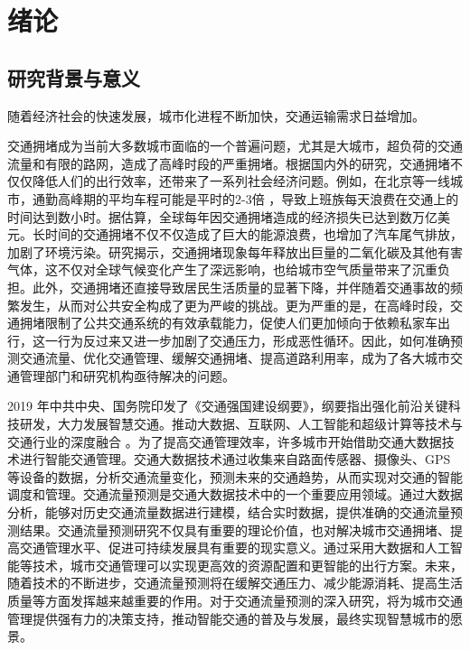 
\chapter{绪论}
\section{研究背景与意义}
随着经济社会的快速发展，城市化进程不断加快，交通运输需求日益增加。

交通拥堵成为当前大多数城市面临的一个普遍问题，尤其是大城市，超负荷的交通流量和有限的路网，造成了高峰时段的严重拥堵。根据国内外的研究，交通拥堵不仅仅降低人们的出行效率，还带来了一系列社会经济问题。例如，在北京等一线城市，通勤高峰期的平均车程可能是平时的2-3倍 \parencite{2021_贾若_交通拥堵判别方法研究综述}，导致上班族每天浪费在交通上的时间达到数小时。据估算，全球每年因交通拥堵造成的经济损失已达到数万亿美元。长时间的交通拥堵不仅不仅造成了巨大的能源浪费，也增加了汽车尾气排放，加剧了环境污染。研究揭示，交通拥堵现象每年释放出巨量的二氧化碳及其他有害气体，这不仅对全球气候变化产生了深远影响，也给城市空气质量带来了沉重负担。此外，交通拥堵还直接导致居民生活质量的显著下降，并伴随着交通事故的频繁发生，从而对公共安全构成了更为严峻的挑战。更为严重的是，在高峰时段，交通拥堵限制了公共交通系统的有效承载能力，促使人们更加倾向于依赖私家车出行，这一行为反过来又进一步加剧了交通压力，形成恶性循环。因此，如何准确预测交通流量、优化交通管理、缓解交通拥堵、提高道路利用率，成为了各大城市交通管理部门和研究机构亟待解决的问题。

2019 年中共中央、国务院印发了《交通强国建设纲要》，纲要指出强化前沿关键科技研发，大力发展智慧交通。推动大数据、互联网、人工智能和超级计算等技术与交通行业的深度融合 \parencite{2019_中共中央国务院印发_交通强国建设纲要}。为了提高交通管理效率，许多城市开始借助交通大数据技术进行智能交通管理。交通大数据技术通过收集来自路面传感器、摄像头、GPS等设备的数据，分析交通流量变化，预测未来的交通趋势，从而实现对交通的智能调度和管理。交通流量预测是交通大数据技术中的一个重要应用领域。通过大数据分析，能够对历史交通流量数据进行建模，结合实时数据，提供准确的交通流量预测结果。交通流量预测研究不仅具有重要的理论价值，也对解决城市交通拥堵、提高交通管理水平、促进可持续发展具有重要的现实意义。通过采用大数据和人工智能等技术，城市交通管理可以实现更高效的资源配置和更智能的出行方案。未来，随着技术的不断进步，交通流量预测将在缓解交通压力、减少能源消耗、提高生活质量等方面发挥越来越重要的作用。对于交通流量预测的深入研究，将为城市交通管理提供强有力的决策支持，推动智能交通的普及与发展，最终实现智慧城市的愿景。

